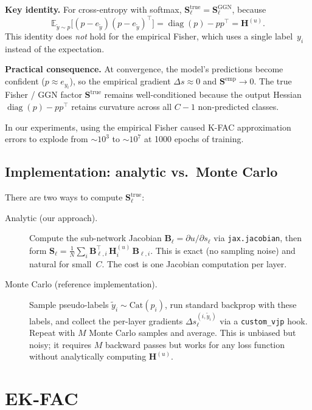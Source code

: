 \documentclass[11pt]{article}
\DeclareMathOperator{\diag}{diag}
\newcommand{\E}{\mathbb{E}}
\begin{document}
\medskip
\noindent
\textbf{Key identity.}\;
For cross-entropy with softmax,
$\mathbf{S}_\ell^{\text{true}} = \mathbf{S}_\ell^{\text{GGN}}$,
because
\[
  \E_{\tilde y\sim p}\bigl[
    (p-e_{\tilde y})(p-e_{\tilde y})^\top
  \bigr]
  = \diag(p) - pp^\top
  = \mathbf{H}^{(u)}.
\]
This identity does \emph{not} hold for the empirical Fisher, which uses a
single label~$y_i$ instead of the expectation.

\medskip
\noindent
\textbf{Practical consequence.}\;
At convergence, the model's predictions become confident
($p\approx e_{y_i}$), so the empirical gradient
$\Delta s \approx 0$ and $\mathbf{S}^{\text{emp}}\to 0$.  The true
Fisher / GGN factor $\mathbf{S}^{\text{true}}$ remains
well-conditioned because the output Hessian
$\diag(p)-pp^\top$ retains curvature across all $C{-}1$
non-predicted classes.

In our experiments, using the empirical Fisher caused K-FAC
approximation errors to explode from ${\sim}10^3$ to ${\sim}10^7$
at 1000 epochs of training.

\subsection{Implementation: analytic vs.\ Monte Carlo}

There are two ways to compute $\mathbf{S}_\ell^{\text{true}}$:

\begin{description}
\item[Analytic (our approach).]
  Compute the sub-network Jacobian
  $\mathbf{B}_\ell = \partial u/\partial s_\ell$ via
  \texttt{jax.jacobian}, then form
  $\mathbf{S}_\ell = \frac{1}{N}\sum_i
   \mathbf{B}_{\ell,i}^\top\,\mathbf{H}_i^{(u)}\,\mathbf{B}_{\ell,i}$.
  This is exact (no sampling noise) and natural for small~$C$.
  The cost is one Jacobian computation per layer.

\item[Monte Carlo (reference implementation).]
  Sample pseudo-labels $\tilde y_i \sim \text{Cat}(p_i)$, run standard
  backprop with these labels, and collect the per-layer gradients
  $\Delta s_\ell^{(i,\tilde y_i)}$ via a \texttt{custom\_vjp} hook.
  Repeat with $M$ Monte Carlo samples and average.  This is unbiased but
  noisy; it requires $M$ backward passes but works for any loss function
  without analytically computing $\mathbf{H}^{(u)}$.
\end{description}

\section{EK-FAC}
\end{document}
